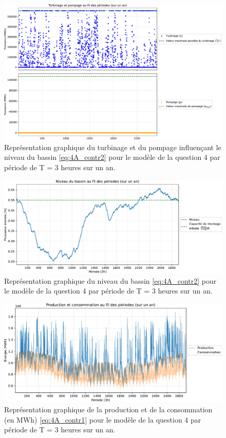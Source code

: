 \documentclass{article}
\begin{document}
\begin{figure}[h!]
    \centering
    \includegraphics[scale=0.6]{GraphesP2/Turbinage_pompage_Q4.pdf}
    \caption{Représentation graphique du turbinage et du pompage
    influençant le niveau du bassin \eqref{eq:4A_contr2} pour le modèle de la question 4 par période de T = 3 heures sur un an.}
    \label{fig:Turbinage_pompage_Q4}
\end{figure}

\begin{figure}[h!]
    \centering
    \includegraphics[scale=0.6]{GraphesP2/Niveau_Bassin_Q4.pdf}
    \caption{Représentation graphique du niveau du bassin \eqref{eq:4A_contr2} pour le modèle 
    de la question 4 par période de T = 3 heures sur un an.}
    \label{fig:Niveau_bassin_Q4}
\end{figure}

\begin{figure}[h!]
    \centering
    \includegraphics[scale=0.6]{GraphesP2/Prod_Cons_Q4.pdf}
    \caption{Représentation graphique de la production et de la consommation (en MWh) \eqref{eq:4A_contr1} pour le modèle de la question 4 
    par période de T = 3 heures sur un an.}
    \label{fig:Prod_Cons_Q4}
\end{figure}
\end{document}
